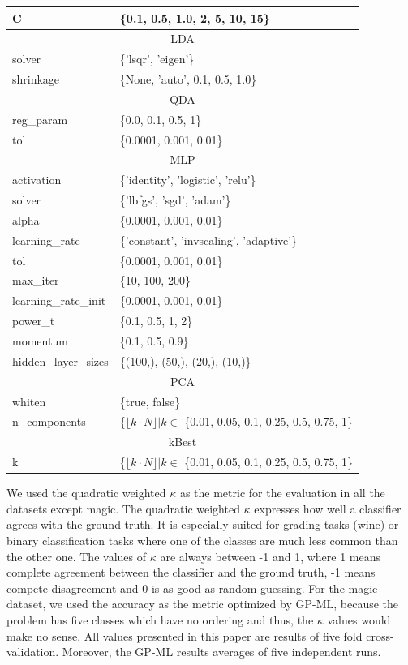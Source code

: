 \documentclass{ws-ijait}
\begin{document}
\begin{table}
{\begin{tabular}{ll}
C & \{0.1, 0.5, 1.0, 2, 5, 10, 15\} \\
\hline
\multicolumn{2}{c}{LDA} \\
\hline
solver & \{'lsqr', 'eigen'\} \\
shrinkage & \{None, 'auto', 0.1, 0.5, 1.0\} \\
\hline
\multicolumn{2}{c}{QDA} \\
\hline
reg\_param & \{0.0, 0.1, 0.5, 1\} \\
tol & \{0.0001, 0.001, 0.01\} \\
\hline
\multicolumn{2}{c}{MLP} \\
\hline
activation & \{'identity', 'logistic', 'relu'\} \\
solver & \{'lbfgs', 'sgd', 'adam'\} \\
alpha & \{0.0001, 0.001, 0.01\} \\
learning\_rate & \{'constant', 'invscaling', 'adaptive'\} \\
tol & \{0.0001, 0.001, 0.01\} \\
max\_iter & \{10, 100, 200\} \\
learning\_rate\_init & \{0.0001, 0.001, 0.01\} \\
power\_t & \{0.1, 0.5, 1, 2\} \\
momentum & \{0.1, 0.5, 0.9\} \\
hidden\_layer\_sizes & \{(100,), (50,), (20,), (10,)\} \\ 
\hline
\multicolumn{2}{c}{PCA} \\
\hline
whiten & \{true, false\} \\     
n\_components & \{$\lfloor k \cdot N \rfloor | k \in$ \{0.01, 0.05, 0.1, 0.25, 0.5, 0.75, 1\} \\
\hline
\multicolumn{2}{c}{kBest} \\
\hline
k & \{$\lfloor k \cdot N \rfloor | k \in$ \{0.01, 0.05, 0.1, 0.25, 0.5, 0.75, 1\} \\
\hline
\end{tabular}}
\end{table} 

We used the quadratic weighted $\kappa$ as the metric for the evaluation in all
the datasets except magic. The quadratic weighted $\kappa$ expresses how well a
classifier agrees with the ground truth. It is especially suited for grading
tasks (wine) or binary classification tasks where one of the classes are much
less common than the other one. The values of $\kappa$ are always between -1 and
1, where 1 means complete agreement between the classifier and the ground truth,
-1 means  compete disagreement and 0 is as  good as random guessing. For the
magic dataset, we used the accuracy as the metric optimized by GP-ML, because
the problem has five classes which have no ordering and thus, the $\kappa$
values would make no sense. All values presented in this paper are results of
five fold cross-validation. Moreover, the GP-ML results averages of five
independent runs.
\end{document}
